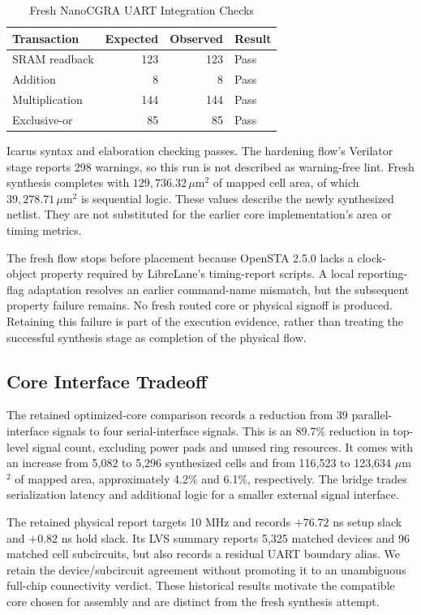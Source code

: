 \documentclass[conference,letterpaper]{IEEEtran}
\begin{document}
\begin{table}[t]
\caption{Fresh NanoCGRA UART Integration Checks}
\label{tab:functional}\centering\small
\begin{tabular}{lrrl}\toprule
Transaction & Expected & Observed & Result\\\midrule
SRAM readback & 123 & 123 & Pass\\
Addition & 8 & 8 & Pass\\
Multiplication & 144 & 144 & Pass\\
Exclusive-or & 85 & 85 & Pass\\\bottomrule
\end{tabular}
\end{table}

Icarus syntax and elaboration checking passes. The hardening flow's Verilator stage reports 298 warnings, so this run is not described as warning-free lint. Fresh synthesis completes with $129{,}736.32\,\mu$m$^2$ of mapped cell area, of which $39{,}278.71\,\mu$m$^2$ is sequential logic. These values describe the newly synthesized netlist. They are not substituted for the earlier core implementation's area or timing metrics.

The fresh flow stops before placement because OpenSTA 2.5.0 lacks a clock-object property required by LibreLane's timing-report scripts. A local reporting-flag adaptation resolves an earlier command-name mismatch, but the subsequent property failure remains. No fresh routed core or physical signoff is produced. Retaining this failure is part of the execution evidence, rather than treating the successful synthesis stage as completion of the physical flow.

\subsection{Core Interface Tradeoff}
The retained optimized-core comparison records a reduction from 39 parallel-interface signals to four serial-interface signals. This is an 89.7\% reduction in top-level signal count, excluding power pads and unused ring resources. It comes with an increase from 5,082 to 5,296 synthesized cells and from 116,523 to 123,634 $\mu$m$^2$ of mapped area, approximately 4.2\% and 6.1\%, respectively. The bridge trades serialization latency and additional logic for a smaller external signal interface.

The retained physical report targets 10 MHz and records $+76.72$ ns setup slack and $+0.82$ ns hold slack. Its LVS summary reports 5,325 matched devices and 96 matched cell subcircuits, but also records a residual UART boundary alias. We retain the device/subcircuit agreement without promoting it to an unambiguous full-chip connectivity verdict. These historical results motivate the compatible core chosen for assembly and are distinct from the fresh synthesis attempt.
\end{document}
